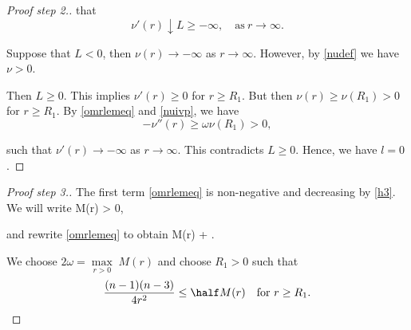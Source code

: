 \begin{proof}[Proof step 2.]
that
\[ \nu'(r)\downarrow L\geq-\infty,\quad\text{as}~r\to\infty. \]

Suppose that $L<0$, then $\nu(r)\to - \infty$ as $r\to\infty$. However, by
\eqref{nudef} we have $\nu>0$.

Then $L\geq 0$. 
This implies $\nu'(r)\geq0$ for $r\geq R_1$. But then $\nu(r)\geq \nu(R_1)>0$ for
$r\geq R_1$. By \eqref{omrlemeq} and \eqref{nuivp}, we have
\[ -\nu''(r)\geq \omega\nu(R_1)>0, \]

such that $\nu'(r)\to-\infty$ as $r\to\infty$. This contradicts $L\geq0$.
Hence, we have $l=0$.
\end{proof}

\begin{proof}[Proof step 3.]
The first term \eqref{omrlemeq} is non-negative and decreasing by \eqref{h3}. We will write
\be \label{mest}
M(r)\coloneqq {} > 0,
\ee

% 
and rewrite \eqref{omrlemeq} to obtain
\be \label{omrm}
M(r) \geq {} + \omega.
\ee

We choose $2\omega = \underset{r>0}{\max}\;M(r)$ and choose $R_1>0$ such that
\[ \frac{(n-1)(n-3)}{4r^2} \leq \half M(r)\quad\text{for}~r\geq R_1. \qedhere \]
\end{proof}

